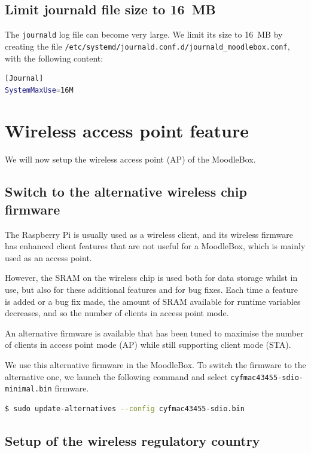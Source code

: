 \documentclass[12pt]{article}
\begin{document}
\subsection{Limit journald file size to 16~MB}

The \lstinline{journald} log file can become very large.
We limit its size to 16~MB by creating the file \lstinline{/etc/systemd/journald.conf.d/journald_moodlebox.conf}, with the following content:\begin{lstlisting}[language=bash]
[Journal]
SystemMaxUse=16M
\end{lstlisting}

\section{Wireless access point feature}

We will now setup the wireless access point (AP) of the MoodleBox.

\subsection{Switch to the alternative wireless chip firmware}

The Raspberry Pi is usually used as a wireless client, and its wireless firmware has enhanced client features that are not useful for a MoodleBox, which is mainly used as an access point.

However, the SRAM on the wireless chip is used both for data storage whilst in use, but also for these additional features and for bug fixes.
Each time a feature is added or a bug fix made, the amount of SRAM available for runtime variables decreases, and so the number of clients in access point mode.

An alternative firmware is available that has been tuned to maximise the number of clients in access point mode (AP) while still supporting client mode (STA).

We use this alternative firmware in the MoodleBox.
To switch the firmware to the alternative one, we launch the following command and select \lstinline{cyfmac43455-sdio-minimal.bin} firmware.

\begin{lstlisting}[language=bash]
$ sudo update-alternatives --config cyfmac43455-sdio.bin
\end{lstlisting}

\subsection{Setup of the wireless regulatory country}
\end{document}
